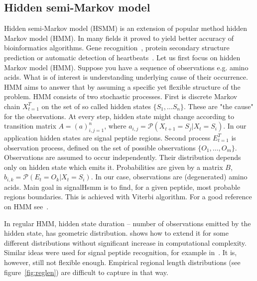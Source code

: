 \documentclass[fleqn,10pt,twoside]{gcb15submission}
\begin{document}
\subsection*{Hidden semi-Markov model}
Hidden semi-Markov model (HSMM) is an extension of popular method  hidden Markov model (HMM).
In many fields it proved to yield better accuracy of bioinformatics algorithms.
Gene recognition~\citep{Pachter02applicationsof}, protein secondary structure prediction  \citep{16571137}
or automatic detection of heartbeats~\citep{7043102}.
Let us first focus on hidden Markov model (HMM). 
Suppose you have a sequence of observations e.g. amino acids. What is of interest is understanding underlying cause of their occurrence. 
HMM aims to answer that by assuming a specific yet flexible structure of the problem.
HMM consists of two stochastic processes. First is discrete Markov chain $X_{t=1}^T$ on the set of so called hidden states $\{S_1, \dots S_n\}$.
These are "the cause" for the observations. At every step, hidden state might change according to transition matrix
$A= (a)_{i,j=1}^n$, where $a_{i,j} = \mathcal{P}(X_{t+1} = S_j | X_t = S_i)$. In our application hidden states are signal peptide regions.
Second process $E_{t=1}^T$ is observation process, defined on the set of possible observations $\{O_1, \dots, O_m\}$. 
Observations are assumed to occur independently. Their distribution depends only on hidden state which emits it. 
Probabilities are given by a matrix $B$, $b_{i,k} = \mathcal{P}(E_t = O_k | X_t = S_i)$.
In our case, observations are (degenerated) amino acids.
Main goal in signalHsmm is to find, for a given peptide, most probable regions boundaries. This is achieved with
Viterbi algorithm.
For a good reference on HMM see~\citep{1989rabinera}.

In regular HMM, hidden state duration -- number of observations emitted by the hidden state, has geometric distribution.
\citep{Durbin98biologicalsequence} shows how to extend it for some different distributions without significant increase in computational 
complexity. Similar ideas were used for signal peptide recognition, for example in~\citep{2004klla}. 
It is, however, still not flexible enough. Empirical regional length distributions (see figure~\ref{fig:reglen})
are difficult to capture in that way.
\end{document}
